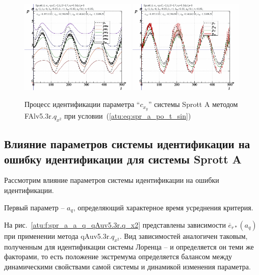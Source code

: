 \begin{figure}[h!]
  \centerline{
    \includegraphics[width=0.49\textwidth]{p/cha/spr_a/FAlv5.3A/sprott_a_FAlv5x3r-pl_n_sin.png}
    \hfill
    \includegraphics[width=0.49\textwidth]{p/cha/spr_a/FAlv5.3A/sprott_a_FAlv5x3r-p_p_sin.png}
  }
  \caption{Процесс идентификации параметра ``$c_{x_y}$'' системы Sprott A методом FAlv5.3r.$q_{x^2}$ при условии~(\ref{atu:eq:spr_a_po_t_sin})}
  \label{atu:f:spr_a_id_FAlv5.3r.q_x2_sin}
\end{figure}



\subsection{Влияние параметров системы идентификации на ошибку идентификации для системы Sprott A}


Рассмотрим влияние параметров системы идентификации на
ошибки идентификации.

Первый параметр --
$a_q$, определяющий характерное время усреднения критерия.

На рис.~\ref{atu:f:spr_a_a_q_qAuv5.3r.q_x2} представлены зависимости
$\overline{e}_{r*}(a_q)$ при применении метода qAuv5.3r.$q_{x^2}$.
Вид зависимостей аналогичен таковым, полученным для идентификации
системы Лоренца -- и определяется он теми же факторами,
то есть положение экстремума определяется балансом между
динамическими свойствами самой системы и динамикой
изменения параметра.


